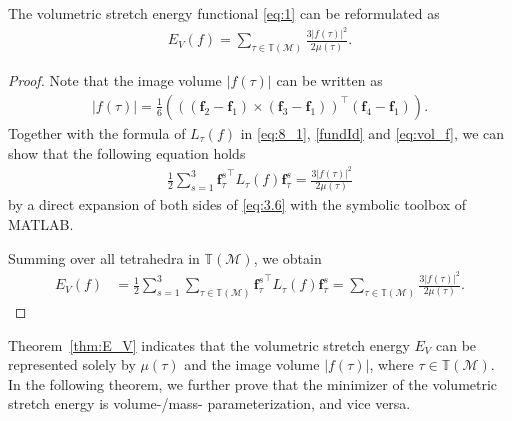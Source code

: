 \documentclass[onefignum,onetabnum]{siamonline220329}
\numberwithin{equation}{section}
\def\f{\mathbf{f}}
\def\M{\mathcal{M}}
\begin{document}
\begin{sloppypar}
\begin{theorem} \label{thm:E_V}
The volumetric stretch energy functional \eqref{eq:1} can be reformulated as
\begin{align}
\label{Vfsem}
E_V(f)=\sum_{\tau\in\mathbb{T}(\mathcal{M})}\frac{3 |f(\tau)|^2}{2\mu(\tau)}.
\end{align}
\end{theorem}
\begin{proof}
Note that the image volume $|f(\tau)|$ can be written as
\begin{align}
|f(\tau)| = \frac{1}{6} \left( ((\f_2-\f_1)\times(\f_3-\f_1))^\top(\f_4-\f_1) \right). \label{eq:vol_f}
\end{align}
Together with the formula of $L_\tau(f)$ in \eqref{eq:8_1}, \eqref{fundId} and \eqref{eq:vol_f}, we can show that the following equation holds 
\begin{align}\label{eq:3.6}
\frac{1}{2} \sum_{s=1}^3 {\f_\tau^s}^\top L_\tau(f) \f_\tau^s =\frac{3 |f(\tau)|^2}{2\mu(\tau)}
\end{align}
by a direct expansion of both sides of \eqref{eq:3.6} with the symbolic toolbox of MATLAB.

Summing over all tetrahedra in $\mathbb{T}(\M)$, we obtain
\begin{align*}
E_V(f) &= \frac{1}{2} \sum_{s=1}^3 \sum_{\tau\in\mathbb{T}(\M)} {\f_\tau^s}^\top L_\tau(f) \f_\tau^s 
=\sum_{\tau\in\mathbb{T}(\mathcal{M})}\frac{3 |f(\tau)|^2}{2\mu(\tau)}.
\end{align*}
\end{proof}

Theorem~\ref{thm:E_V} indicates that the volumetric stretch energy $E_V$ can be represented solely by $\mu(\tau)$ and the image volume $|f(\tau)|$, where $\tau\in\mathbb{T}(\M)$. 
In the following theorem, we further prove that the minimizer of the volumetric stretch energy is volume-/mass- parameterization, and vice versa.


\end{sloppypar}
\end{document}
